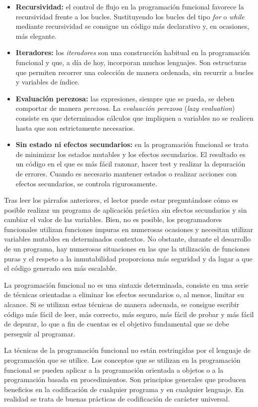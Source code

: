 \begin{itemize}
   \item \textbf{Recursividad:} el control de flujo en la programación funcional favorece la recursividad frente a los bucles. Sustituyendo los bucles del tipo \textit{for} o \textit{while} mediante recursividad se consigue un código más declarativo y, en ocasiones, más elegante.
   \item \textbf{Iteradores:} los \textit{iteradores} son una construcción habitual en la programación funcional y que, a día de hoy, incorporan muchos lenguajes. Son estructuras que permiten recorrer una colección de manera ordenada, sin recurrir a bucles y variables de índice. 
   \item \textbf{Evaluación perezosa:} las expresiones, siempre que se pueda, se deben comportar de manera \textit{perezosa}. La \textit{evaluación perezosa} (\textit{lazy evaluation}) consiste en que determinados cálculos que impliquen a variables no se realicen hasta que son estrictamente necesarios.
   \item \textbf{Sin estado ni efectos secundarios:} en la programación funcional se trata de minimizar los estados mutables y los efectos secundarios. El resultado es un código en el que es más fácil razonar, hacer test y realizar la depuración de errores. Cuando es necesario mantener estados o realizar acciones con efectos secundarios, se controla rigurosamente.
\end{itemize}

Tras leer los párrafos anteriores, el lector puede estar preguntándose cómo es posible realizar un programa de aplicación práctica sin efectos secundarios y sin cambiar el valor de las variables. Bien, no es posible, los programadores funcionales utilizan funciones impuras en numerosas ocasiones y necesitan utilizar variables mutables en determinados contextos. No obstante, durante el desarrollo de un programa, hay numerosas situaciones en las que la utilización de funciones puras y el respeto a la inmutabilidad proporciona más seguridad y da lugar a que el código generado sea más escalable.

La programación funcional no es una sintaxis determinada, consiste en una serie de técnicas orientadas a eliminar los efectos secundarios o, al menos, limitar su alcance. Si se utilizan estas técnicas de manera adecuada, se consigue escribir código más fácil de leer, más correcto, más seguro, más fácil de probar y más fácil de depurar, lo que a fin de cuentas es el objetivo fundamental que se debe perseguir al programar. 

La técnicas de la programación funcional no están restringidas por el lenguaje de programación que se utilice. Los conceptos que se utilizan en la programación funcional se pueden aplicar a la programación orientada a objetos o a la programación basada en procedimientos. Son principios generales que producen beneficios en la codificación de cualquier programa y en cualquier lenguaje. En realidad se trata de buenas prácticas de codificación de carácter universal.

